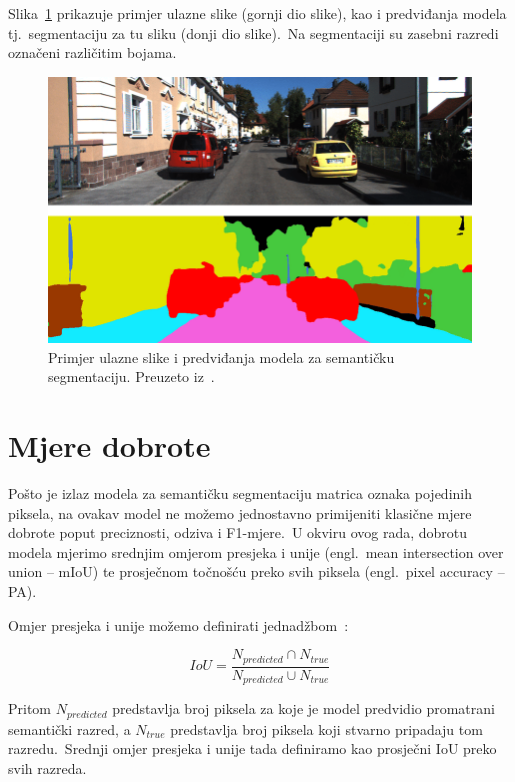 \documentclass[times, utf8, seminar, numeric]{fer}
\begin{document}
\pagebreak

Slika~\ref{fig:semseg} prikazuje primjer ulazne slike (gornji dio slike), kao i predviđanja modela tj.\ segmentaciju za tu sliku (donji dio slike).\ 
Na segmentaciji su zasebni razredi označeni različitim bojama.\

\begin{figure}[h]
    \centering
    \includegraphics[scale=0.4]{./Slike/sem_seg.png}
    \caption{Primjer ulazne slike i predviđanja modela za semantičku segmentaciju. Preuzeto iz~\cite{jeong2018towards}.}
    \label{fig:semseg}
\end{figure}

\section{Mjere dobrote}

Pošto je izlaz modela za semantičku segmentaciju matrica oznaka pojedinih piksela, na ovakav model ne možemo jednostavno primijeniti klasične mjere dobrote poput preciznosti, odziva i F1-mjere.\ 
U okviru ovog rada, dobrotu modela mjerimo srednjim omjerom presjeka i unije (engl.\ mean intersection over union – mIoU) te prosječnom točnošću preko svih piksela (engl.\ pixel accuracy – PA).\

Omjer presjeka i unije možemo definirati jednadžbom~\cite{rahman2016optimizing}:

\begin{equation}
    IoU = \frac{N_{predicted} \cap N_{true}}{N_{predicted} \cup N_{true}}
    \label{eq:IoU}
\end{equation}

Pritom $N_{predicted}$ predstavlja broj piksela za koje je model predvidio promatrani semantički razred, a $N_{true}$ predstavlja broj piksela koji stvarno pripadaju tom razredu.\ 
Srednji omjer presjeka i unije tada definiramo kao prosječni IoU preko svih razreda.\ 
  
\end{document}
